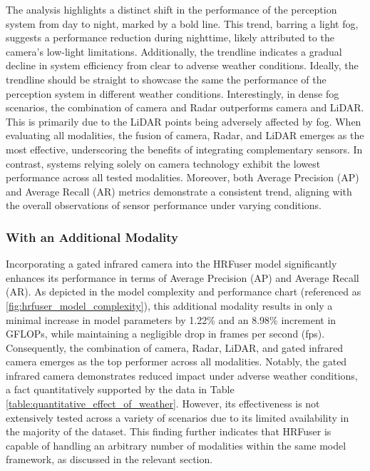 \documentclass[report.tex]{subfiles}
\begin{document}
    The analysis highlights a distinct shift in the performance of the perception system from day to night, marked by a bold line. This trend, barring a light fog, suggests a performance reduction during nighttime, likely attributed to the camera's low-light limitations. Additionally, the trendline indicates a gradual decline in system efficiency from clear to adverse weather conditions. Ideally, the trendline should be straight to showcase the same the performance of the perception system in different weather conditions. Interestingly, in dense fog scenarios, the combination of camera and Radar outperforms camera and LiDAR. This is primarily due to the LiDAR points being adversely affected by fog. When evaluating all modalities, the fusion of camera, Radar, and LiDAR emerges as the most effective, underscoring the benefits of integrating complementary sensors. In contrast, systems relying solely on camera technology exhibit the lowest performance across all tested modalities. Moreover, both Average Precision (AP) and Average Recall (AR) metrics demonstrate a consistent trend, aligning with the overall observations of sensor performance under varying conditions.

    \subsubsection{With an Additional Modality}
    
    Incorporating a gated infrared camera into the HRFuser model significantly enhances its performance in terms of Average Precision (AP) and Average Recall (AR). As depicted in the model complexity and performance chart (referenced as \ref{fig:hrfuser_model_complexity}), this additional modality results in only a minimal increase in model parameters by 1.22\% and an 8.98\% increment in GFLOPs, while maintaining a negligible drop in frames per second (fps). Consequently, the combination of camera, Radar, LiDAR, and gated infrared camera emerges as the top performer across all modalities. Notably, the gated infrared camera demonstrates reduced impact under adverse weather conditions, a fact quantitatively supported by the data in Table \ref{table:quantitative_effect_of_weather}. However, its effectiveness is not extensively tested across a variety of scenarios due to its limited availability in the majority of the dataset. This finding further indicates that HRFuser is capable of handling an arbitrary number of modalities within the same model framework, as discussed in the relevant section.
\end{document}
